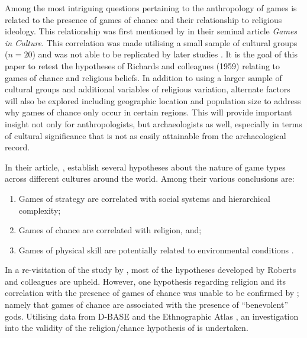 \documentclass[%
	]{ijsra}
\begin{document}
Among the most intriguing questions pertaining to the anthropology of games is related to the presence of games of chance and their relationship to religious ideology. This relationship was first mentioned by \textcite{roberts1959} in their seminal article \textit{Games in Culture}. This correlation was made utilising a small sample of cultural groups ($n = 20$) and was not able to be replicated by later studies \parencite[e.g.][]{chick1998}. It is the goal of this paper to retest the hypotheses of Richards and colleagues (1959) relating to games of chance and religious beliefs. In addition to using a larger sample of cultural groups and additional variables of religious variation, alternate factors will also be explored including geographic location and population size to address why games of chance only occur in certain regions. This will provide important insight not only for anthropologists, but archaeologists as well, especially in terms of cultural significance that is not as easily attainable from the archaeological record.


In their article, , \citeauthor{roberts1959}  establish several hypotheses about the nature of game types across different cultures around the world. Among their various conclusions are:

\begin{enumerate}
\item Games of strategy are correlated with social systems and hierarchical complexity;
\item Games of chance are correlated with religion, and;
\item Games of physical skill are potentially related to environmental conditions \parencite[604]{roberts1959}.
\end{enumerate}

In a re-visitation of the study by \textcite{chick1998}, most of the hypotheses developed by Roberts and colleagues are upheld. However, one hypothesis regarding religion and its correlation with the presence of games of chance was unable to be confirmed by \textcite[192]{chick1998}; namely that games of chance are associated with the presence of ``benevolent” gods. 
Utilising data from D-BASE and the Ethnographic Atlas \parencites{murdock1962}{barry1980}{gray1999}{korotayev2004}{bondarenko2005}, an investigation into the validity of the religion/chance hypothesis of \textcite{roberts1959} is undertaken.
\end{document}
